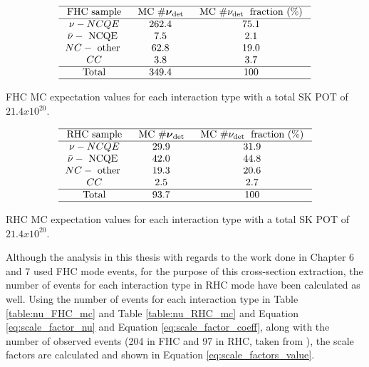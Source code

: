 \begin{table}
    $$
    \begin{array}{ccc}
    \hline \text { FHC sample } & \text { MC } \# \boldsymbol{\nu}_{\text {det }} & \text { MC } \# \nu_{\text {det }} \text { fraction (\%) } \\
    \hline \nu-N C Q E & 262.4 & 75.1 \\
    \bar{\nu}-\text { NCQE } & 7.5 & 2.1 \\
    N C-\text { other } & 62.8 & 19.0 \\
    C C & 3.8 & 3.7\\
    \hline \text { Total } & 349.4 & 100 \\
    \hline
    \end{array}
    $$
    \caption{FHC MC expectation values for each interaction type with a total SK POT of $21.4 x 10^{20}$. }
    \label{table:nu_FHC_mc}
\end{table}


\begin{table}
    $$
    \begin{array}{ccc}
    \hline \text { RHC sample } & \text { MC } \# \boldsymbol{\nu}_{\text {det }} & \text { MC } \# \nu_{\text {det }} \text { fraction (\%) } \\
    \hline \nu-N C Q E & 29.9 & 31.9 \\
    \bar{\nu}-\text { NCQE } & 42.0 & 44.8 \\
    N C-\text { other } & 19.3 & 20.6 \\
    C C & 2.5 & 2.7 \\
    \hline \text { Total } & 93.7 & 100 \\
    \hline
    \end{array}
    $$
    \caption{RHC MC expectation values for each interaction type with a total SK POT of $21.4 x 10^{20}$.}
    \label{table:nu_RHC_mc}
\end{table}

Although the analysis in this thesis with regards to the work done in Chapter 6 and 7 used FHC mode events, for the purpose of this cross-section extraction, the number of events for each interaction type in RHC mode have been calculated as well. Using the number of events for each interaction type in Table \ref{table:nu_FHC_mc} and Table \ref{table:nu_RHC_mc} and Equation \ref{eq:scale_factor_nu} and Equation \ref{eq:scale_factor_coeff}, along with the number of observed events (204 in FHC and 97 in RHC, taken from \cite{Abe_2019}), the scale factors are calculated and shown in Equation \ref{eq:scale_factors_value}.

